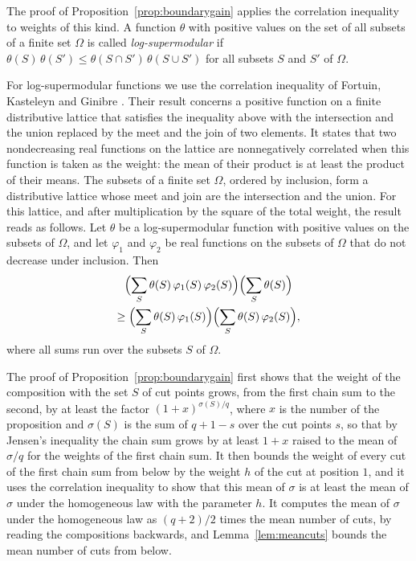 \documentclass{amsart}
\makeatletter
\theoremstyle{definition}
\theoremstyle{remark}
\numberwithin{equation}{section}
\def\subsection{\@startsection{subsection}{2}\z@{.5\linespacing\@plus.7\linespacing}{-.5em}{\normalfont\bfseries\boldmath}}
\makeatother
\begin{document}
The proof of Proposition~\ref{prop:boundarygain} applies the correlation
inequality to weights of this kind.
A function $\theta$ with positive values on the set of all subsets of a
finite set $\Omega$ is called \emph{log-supermodular} if
$\theta(S)\,\theta(S')\le\theta(S\cap S')\,\theta(S\cup S')$ for all subsets
$S$ and $S'$ of $\Omega$.

For log-supermodular functions we use the correlation inequality of Fortuin,
Kasteleyn and Ginibre \cite[Proposition~1]{fortuin1971}. Their result
concerns a positive function on a finite distributive lattice that satisfies
the inequality above with the intersection and the union replaced by the
meet and the join of two elements. It states that two nondecreasing real
functions on the lattice are nonnegatively correlated when this function is
taken as the weight: the mean of their product is at least the product of
their means. The subsets of a finite set $\Omega$, ordered by inclusion, form
a distributive lattice whose meet and join are the intersection and the
union. For this lattice, and after multiplication by the square of the total
weight, the result reads as follows. Let $\theta$ be a log-supermodular
function with positive values on the subsets of $\Omega$, and let $\varphi_1$
and $\varphi_2$ be real functions on the subsets of $\Omega$ that do not
decrease under inclusion. Then
\begin{multline}\label{eq:gain-fkg}
\Bigl(\sum_{S}\theta(S)\,\varphi_1(S)\,\varphi_2(S)\Bigr)
\Bigl(\sum_{S}\theta(S)\Bigr)\\
\ge\Bigl(\sum_{S}\theta(S)\,\varphi_1(S)\Bigr)
\Bigl(\sum_{S}\theta(S)\,\varphi_2(S)\Bigr),
\end{multline}
where all sums run over the subsets $S$ of $\Omega$.

\subsection{The gain of the chain sum}\label{subsec:gain-proof}

The proof of Proposition~\ref{prop:boundarygain} first shows that the
weight of the composition with the set $S$ of cut points grows, from the
first chain sum to the second, by at least the factor
$(1+x)^{\sigma(S)/q}$, where $x$ is the number of the proposition and
$\sigma(S)$ is the sum of $q+1-s$ over the cut points $s$, so that by
Jensen's inequality the chain sum grows by at least $1+x$ raised to the mean
of $\sigma/q$ for the weights of the first chain sum. It then bounds the
weight of every cut of the first chain sum from below by the weight $h$ of
the cut at position $1$, and it uses the correlation inequality to show that
this mean of $\sigma$ is at least the mean of $\sigma$ under the homogeneous
law with the parameter $h$. It computes the mean of $\sigma$ under
the homogeneous law as $(q+2)/2$ times the mean number of cuts, by reading
the compositions backwards, and Lemma~\ref{lem:meancuts} bounds the mean
number of cuts from below.
\end{document}
